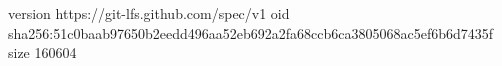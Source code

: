 version https://git-lfs.github.com/spec/v1
oid sha256:51c0baab97650b2eedd496aa52eb692a2fa68ccb6ca3805068ac5ef6b6d7435f
size 160604
